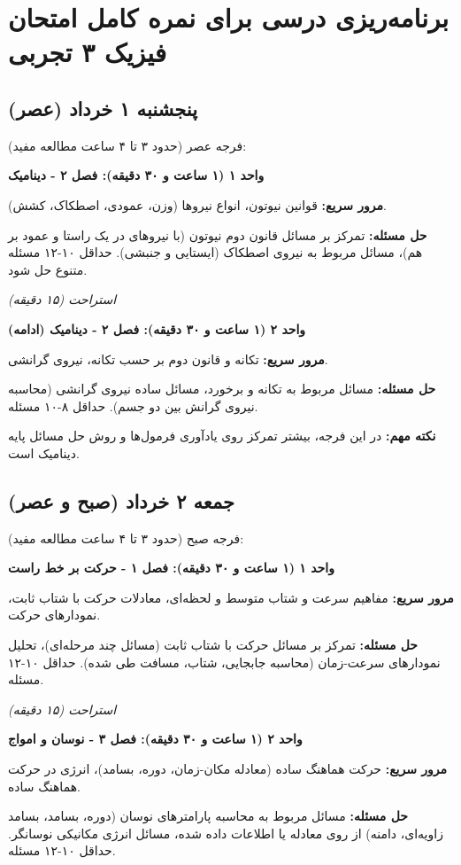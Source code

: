 \documentclass[12pt]{article}
\newcommand{\unithead}[1]{\par\vspace{1ex}\noindent\textbf{#1}\par\nopagebreak[4]\vspace{0.5ex}}
\newcommand{\休息}[1]{\par\centering\textit{#1}\par\vspace{1ex}} %
\begin{document}
\section*{برنامه‌ریزی درسی برای نمره کامل امتحان فیزیک ۳ تجربی}

\subsection*{پنجشنبه ۱ خرداد (عصر)}
فرجه عصر (حدود ۳ تا ۴ ساعت مطالعه مفید):

\unithead{واحد ۱ (۱ ساعت و ۳۰ دقیقه): فصل ۲ - دینامیک}
\noindent\textbf{مرور سریع: }قوانین نیوتون، انواع نیروها (وزن، عمودی، اصطکاک، کشش).
\par\noindent\textbf{حل مسئله: }تمرکز بر مسائل قانون دوم نیوتون (با نیروهای در یک راستا و عمود بر هم)، مسائل مربوط به نیروی اصطکاک (ایستایی و جنبشی). حداقل ۱۰-۱۲ مسئله متنوع حل شود.

\休息{استراحت (۱۵ دقیقه)}

\unithead{واحد ۲ (۱ ساعت و ۳۰ دقیقه): فصل ۲ - دینامیک (ادامه)}
\noindent\textbf{مرور سریع: }تکانه و قانون دوم بر حسب تکانه، نیروی گرانشی.
\par\noindent\textbf{حل مسئله: }مسائل مربوط به تکانه و برخورد، مسائل ساده نیروی گرانشی (محاسبه نیروی گرانش بین دو جسم). حداقل ۸-۱۰ مسئله.
\par\noindent\textbf{نکته مهم: }در این فرجه، بیشتر تمرکز روی یادآوری فرمول‌ها و روش حل مسائل پایه دینامیک است.

\subsection*{جمعه ۲ خرداد (صبح و عصر)}
فرجه صبح (حدود ۳ تا ۴ ساعت مطالعه مفید):

\unithead{واحد ۱ (۱ ساعت و ۳۰ دقیقه): فصل ۱ - حرکت بر خط راست}
\noindent\textbf{مرور سریع: }مفاهیم سرعت و شتاب متوسط و لحظه‌ای، معادلات حرکت با شتاب ثابت، نمودارهای حرکت.
\par\noindent\textbf{حل مسئله: }تمرکز بر مسائل حرکت با شتاب ثابت (مسائل چند مرحله‌ای)، تحلیل نمودارهای سرعت-زمان (محاسبه جابجایی، شتاب، مسافت طی شده). حداقل ۱۰-۱۲ مسئله.

\休息{استراحت (۱۵ دقیقه)}

\unithead{واحد ۲ (۱ ساعت و ۳۰ دقیقه): فصل ۳ - نوسان و امواج}
\noindent\textbf{مرور سریع: }حرکت هماهنگ ساده (معادله مکان-زمان، دوره، بسامد)، انرژی در حرکت هماهنگ ساده.
\par\noindent\textbf{حل مسئله: }مسائل مربوط به محاسبه پارامترهای نوسان (دوره، بسامد، بسامد زاویه‌ای، دامنه) از روی معادله یا اطلاعات داده شده، مسائل انرژی مکانیکی نوسانگر. حداقل ۱۰-۱۲ مسئله.
\end{document}
